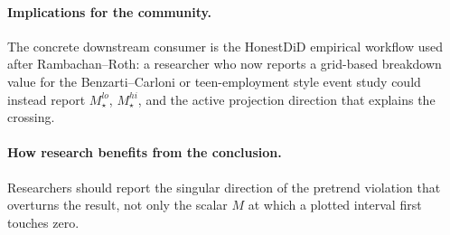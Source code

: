 \documentclass[11pt]{article}
\theoremstyle{definition}
\theoremstyle{plain}
\theoremstyle{remark}
\begin{document}
\paragraph{Implications for the community.}
The concrete downstream consumer is the HonestDiD empirical workflow used after Rambachan--Roth: a researcher who now reports a grid-based breakdown value for the Benzarti--Carloni or teen-employment style event study could instead report \(M_\star^{lo}\), \(M_\star^{hi}\), and the active projection direction that explains the crossing.

\paragraph{How research benefits from the conclusion.}
Researchers should report the singular direction of the pretrend violation that overturns the result, not only the scalar \(M\) at which a plotted interval first touches zero.
\end{document}

